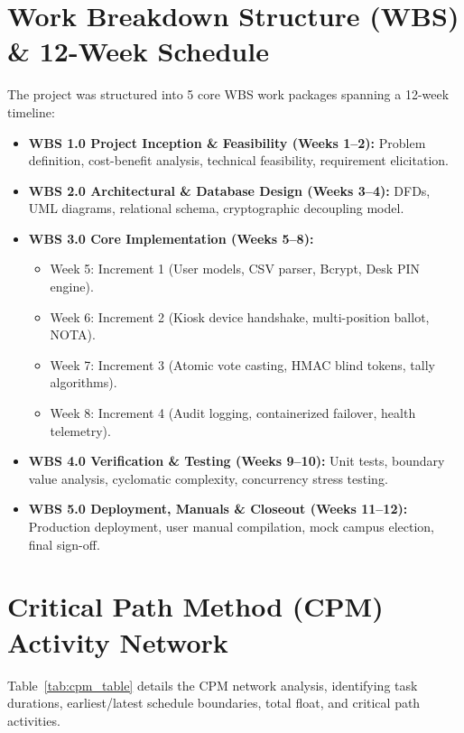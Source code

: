 \documentclass[12pt,a4paper,oneside]{report}
\begin{document}
\section{Work Breakdown Structure (WBS) \& 12-Week Schedule}
The project was structured into 5 core WBS work packages spanning a 12-week timeline:
\begin{itemize}
    \item \textbf{WBS 1.0 Project Inception \& Feasibility (Weeks 1--2):} Problem definition, cost-benefit analysis, technical feasibility, requirement elicitation.
    \item \textbf{WBS 2.0 Architectural \& Database Design (Weeks 3--4):} DFDs, UML diagrams, relational schema, cryptographic decoupling model.
    \item \textbf{WBS 3.0 Core Implementation (Weeks 5--8):}
    \begin{itemize}
        \item Week 5: Increment 1 (User models, CSV parser, Bcrypt, Desk PIN engine).
        \item Week 6: Increment 2 (Kiosk device handshake, multi-position ballot, NOTA).
        \item Week 7: Increment 3 (Atomic vote casting, HMAC blind tokens, tally algorithms).
        \item Week 8: Increment 4 (Audit logging, containerized failover, health telemetry).
    \end{itemize}
    \item \textbf{WBS 4.0 Verification \& Testing (Weeks 9--10):} Unit tests, boundary value analysis, cyclomatic complexity, concurrency stress testing.
    \item \textbf{WBS 5.0 Deployment, Manuals \& Closeout (Weeks 11--12):} Production deployment, user manual compilation, mock campus election, final sign-off.
\end{itemize}

\section{Critical Path Method (CPM) Activity Network}
Table~\ref{tab:cpm_table} details the CPM network analysis, identifying task durations, earliest/latest schedule boundaries, total float, and critical path activities.
\end{document}
